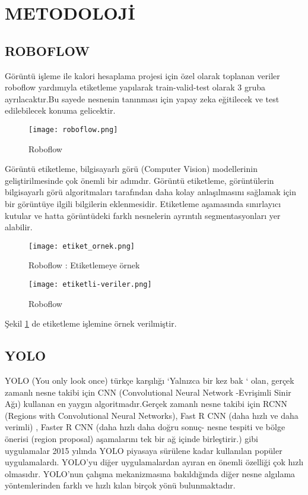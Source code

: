 \documentclass[11pt,a4paper]{report}
\begin{document}
 
   \section{METODOLOJİ}
   \subsection{ROBOFLOW}
   	\begin{justify}
   		Görüntü işleme ile kalori hesaplama projesi için özel olarak toplanan veriler roboflow \cite{Roboflow} yardımıyla etiketleme yapılarak train-valid-test olarak 3 gruba ayrılacaktır.Bu sayede nesnenin tanınması için yapay zeka eğitilecek ve test edilebilecek konuma gelicektir.
   	\newline
   	
   	\begin{figure}[!h]
   		\centering
   		\texttt{[image: roboflow.png]}
   		\caption{Roboflow}
   	\end{figure}
   	\newpage
   	Görüntü etiketleme, bilgisayarlı görü (Computer Vision) modellerinin geliştirilmesinde çok önemli bir adımdır. Görüntü etiketleme, görüntülerin bilgisayarlı görü algoritmaları tarafından daha kolay anlaşılmasını sağlamak için bir görüntüye ilgili bilgilerin eklenmesidir. Etiketleme aşamasında sınırlayıcı kutular ve hatta görüntüdeki farklı nesnelerin ayrıntılı segmentasyonları yer alabilir.
   	\newline
   	
   	\begin{figure}[!h]
   		\centering
   		\texttt{[image: etiket\_ornek.png]}
   		\caption{Roboflow : Etiketlemeye örnek}
        \label{etiket}
   	\end{figure}
   	
   	\begin{figure}[!h]
   		\centering
   		\texttt{[image: etiketli-veriler.png]}
   		\label{ornek}
   		\caption{Roboflow}
   	\end{figure}
   	Şekil \ref{etiket} de etiketleme işlemine örnek verilmiştir.
   	
   	\newpage
   	\subsection{YOLO}
   	\begin{justify}
   	YOLO (You only look once) türkçe karşılığı ‘Yalnızca bir kez bak ‘ olan, gerçek zamanlı nesne takibi için CNN (Convolutional Neural Network -Evrişimli Sinir Ağı) kullanan en yaygın algoritmadır.Gerçek zamanlı nesne takibi için RCNN (Regions with Convolutional Neural Networks), Fast R CNN (daha hızlı ve daha verimli) , Faster R CNN (daha hızlı daha doğru sonuç- nesne tespiti ve bölge önerisi (region proposal) aşamalarını tek bir ağ içinde birleştirir.) gibi uygulamalar 2015 yılında YOLO piyasaya sürülene kadar kullanılan popüler uygulamalardı. YOLO’yu diğer uygulamalardan ayıran en önemli özelliği çok hızlı olmasıdır. YOLO’nun çalışma mekanizmasına bakıldığında diğer nesne algılama yöntemlerinden farklı ve hızlı kılan birçok yönü bulunmaktadır. 
   	\newline
   	

\end{justify}
\end{justify}
\end{document}
